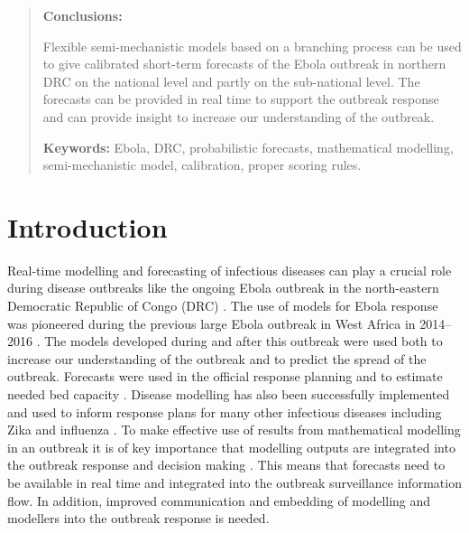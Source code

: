 \documentclass[12pt]{article}
\begin{document}
\begin{abstract}
  \medskip
  
  {\bf Conclusions:}

  Flexible semi-mechanistic models based on a branching process can be used to give calibrated short-term forecasts of the Ebola outbreak in northern DRC on the national level and partly on the sub-national level. The forecasts can be provided in real time to support the outbreak response and can provide  insight to increase our understanding of the outbreak.

  \medskip

  {\bf Keywords:} Ebola, DRC, probabilistic forecasts, mathematical modelling, semi-mechanistic model, calibration, proper scoring rules.

\end{abstract}

\newpage

\tableofcontents

\newpage

\section{Introduction}


Real-time modelling and forecasting of infectious diseases can play a crucial role during disease outbreaks like the ongoing Ebola outbreak in the north-eastern Democratic Republic of Congo (DRC) \cite{heesterbeekModelingInfectiousDisease2015,riversUsingOutbreakScience2019a}. The use of models for Ebola response was pioneered during the previous large Ebola outbreak in West Africa in 2014--2016 \cite{chretienMathematicalModelingWest}. The models developed during and after this outbreak were used both to increase our understanding of the outbreak and to predict the spread of the outbreak. Forecasts were used in the official response planning \cite{whoebolaresponseteamEbolaVirusDisease2014} and to estimate needed bed capacity \cite{camachoTemporalChangesEbola2015}. Disease modelling has also been successfully implemented and used to inform response plans for many other infectious diseases including Zika \cite{kobresSystematicReviewEvaluation2019} and influenza \cite{chretienInfluenzaForecastingHuman2014}. To make effective use of results from mathematical modelling in an outbreak it is of key importance that modelling outputs are integrated into the outbreak response and decision making \cite{riversUsingOutbreakScience2019a}. This means that forecasts need to be available in real time and integrated into the outbreak surveillance information flow. In addition, improved communication and embedding of modelling and modellers into the outbreak response is needed. 
\end{document}
